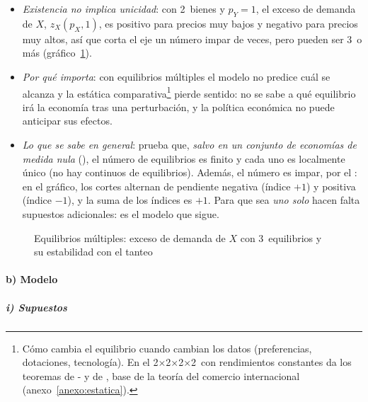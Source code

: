 \documentclass[11pt]{article}
\begin{document}
\begin{itemize}
\item \emph{Existencia no implica unicidad}: con 2~bienes y $p_Y=1$, el exceso de demanda de $X$, $z_X(p_X,1)$, es positivo para precios muy bajos y negativo para precios muy altos, así que corta el eje un número impar de veces, pero pueden ser 3~o más (gráfico~\ref{fig:equilibrios-multiples}).
\item \emph{Por qué importa}: con equilibrios múltiples el modelo no predice cuál se alcanza y la estática comparativa\footnote{Cómo cambia el equilibrio cuando cambian los datos (preferencias, dotaciones, tecnología). En el 2×2×2×2~con rendimientos constantes da los teoremas de - y de , base de la teoría del comercio internacional  (anexo~\ref{anexo:estatica}).} pierde sentido: no se sabe a qué equilibrio irá la economía tras una perturbación, y la política económica no puede anticipar sus efectos.
\item \emph{Lo que se sabe en general}: \textcite{Debreu1970Economies} prueba que, \emph{salvo en un conjunto de economías de medida nula} (), el número de equilibrios es finito y cada uno es localmente único (no hay continuos de equilibrios). Además, el número es impar, por el \nocite{Dierker1972Two}: en el gráfico, los cortes alternan de pendiente negativa (índice $+1$) y positiva (índice $-1$), y la suma de los índices es $+1$. Para que sea \emph{uno solo} hacen falta supuestos adicionales: es el modelo que sigue.
\end{itemize}

\begin{figure}[H]
\centering
\caption{Equilibrios múltiples: exceso de demanda de $X$ con 3~equilibrios y su estabilidad con el tanteo}\label{fig:equilibrios-multiples}
\end{figure}

\paragraph{b) Modelo}

\subparagraph{i) Supuestos}
\end{document}
